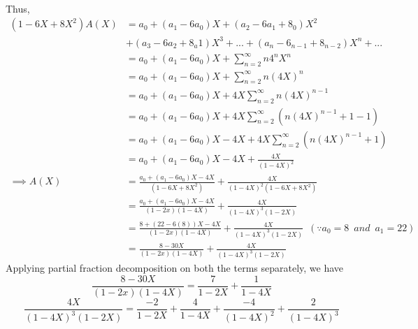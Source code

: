 \documentclass{article}
\begin{document}
\begin{flushleft}
\begin{align*}
    \end{align*}
    Thus,\\
    \begin{align*}
        (1-6X+8X^2)A(X) & =a_0+(a_1-6a_0)X+(a_2-6a_1+8_0)X^2                                                                                 \\
                        & +(a_3-6a_2+8_a1)X^3+...+(a_n-6_{n-1}+8_{n-2})X^n+...                                                               \\
                        & =a_0+(a_1-6a_0)X+\sum_{n=2}^{\infty}n4^nX^n                                                                        \\
                        & =a_0+(a_1-6a_0)X+\sum_{n=2}^{\infty}n(4X)^n                                                                        \\
                        & =a_0+(a_1-6a_0)X+4X\sum_{n=2}^{\infty}n(4X)^{n-1}                                                                  \\
                        & =a_0+(a_1-6a_0)X+4X\sum_{n=2}^{\infty}(n(4X)^{n-1}+1-1)                                                            \\
                        & =a_0+(a_1-6a_0)X-4X+4X\sum_{n=2}^{\infty}(n(4X)^{n-1}+1)                                                           \\
                        & =a_0+(a_1-6a_0)X-4X+\frac{4X}{(1-4X)^2}                                                                            \\
        \implies A(X)   & =\frac{a_0+(a_1-6a_0)X-4X}{(1-6X+8X^2)}+\frac{4X}{(1-4X)^2(1-6X+8X^2)}                                             \\
                        & =\frac{a_0+(a_1-6a_0)X-4X}{(1-2x)(1-4X)}+\frac{4X}{(1-4X)^3(1-2X)}                                                 \\
                        & =\frac{8+(22-6(8))X-4X}{(1-2x)(1-4X)}+\frac{4X}{(1-4X)^3(1-2X)}\enspace(\because a_0=8\enspace and\enspace a_1=22) \\
                        & =\frac{8-30X}{(1-2x)(1-4X)}+\frac{4X}{(1-4X)^3(1-2X)}
    \end{align*}
    Applying partial fraction decomposition on both the terms separately, we have\\
    $$\frac{8-30X}{(1-2x)(1-4X)}=\frac{7}{1-2X}+\frac{1}{1-4X}$$
    $$\frac{4X}{(1-4X)^3(1-2X)}=\frac{-2}{1-2X}+\frac{4}{1-4X}+\frac{-4}{(1-4X)^2}+\frac{2}{(1-4X)^3}$$

\end{flushleft}
\end{document}
